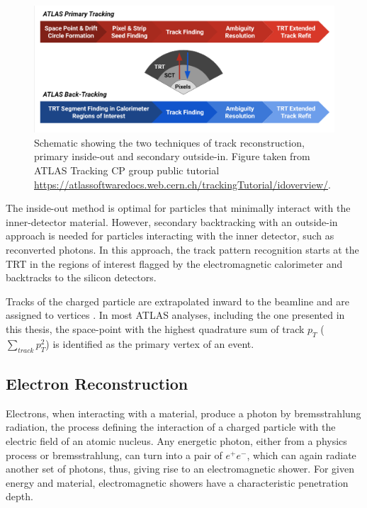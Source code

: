 \begin{figure}
    \centering
    \includegraphics[width=.9\linewidth]{figures/LHC/trackingflowchart.png}
    \caption{Schematic showing the two techniques of track reconstruction, primary inside-out and secondary outside-in. Figure taken from ATLAS Tracking CP group public tutorial \url{https://atlassoftwaredocs.web.cern.ch/trackingTutorial/idoverview/}. \label{fig:TrackingOutline}}
\end{figure}

The inside-out method is optimal for particles that minimally interact with the inner-detector material. However, secondary backtracking with an outside-in approach is needed for particles interacting with the inner detector, such as reconverted photons. In this approach, the track pattern recognition starts at the TRT in the regions of interest flagged by the electromagnetic calorimeter and backtracks to the silicon detectors. 

Tracks of the charged particle are extrapolated inward to the beamline and are assigned to vertices \cite{VertexReconstruction}. In most ATLAS analyses, including the one presented in this thesis, the space-point with the highest quadrature sum of track $p_T$ ($\sum_{track}{p_{T}^2}$) is identified as the primary vertex of an event.

\subsection{Electron Reconstruction}
\label{subsec:ParticleRecon_Elec}
Electrons, when interacting with a material, produce a photon by bremsstrahlung radiation, the process defining the interaction of a charged particle with the electric field of an atomic nucleus. Any energetic photon, either from a physics process or bremsstrahlung, can turn into a pair of $e^{+}e^{-}$, which can again radiate another set of photons, thus, giving rise to an electromagnetic shower. For given energy and material, electromagnetic showers have a characteristic penetration depth.

